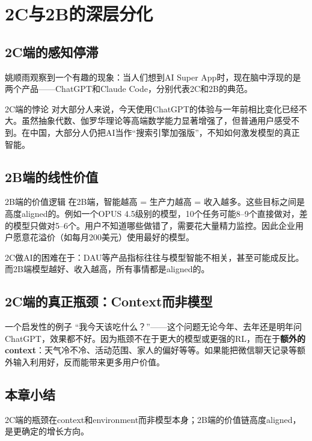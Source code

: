 \section{2C与2B的深层分化}

\subsection{2C端的感知停滞}

姚顺雨观察到一个有趣的现象：当人们想到AI Super App时，现在脑中浮现的是两个产品——ChatGPT和Claude Code，分别代表2C和2B的典范。

\begin{warningbox}{2C端的悖论}
对大部分人来说，今天使用ChatGPT的体验与一年前相比变化已经不大。虽然抽象代数、伽罗华理论等高端数学能力显著增强了，但普通用户感受不到。在中国，大部分人仍把AI当作``搜索引擎加强版''，不知如何激发模型的真正智能。
\end{warningbox}

\subsection{2B端的线性价值}

\begin{importantbox}{2B端的价值逻辑}
在2B端，智能越高 = 生产力越高 = 收入越多。这些目标之间是高度aligned的。例如一个OPUS 4.5级别的模型，10个任务可能8--9个直接做对，差的模型只做对5--6个。用户不知道哪些做错了，需要花大量精力监控。因此企业用户愿意花溢价（如每月200美元）使用最好的模型。
\end{importantbox}

2C做AI的困难在于：DAU等产品指标往往与模型智能不相关，甚至可能成反比。而2B端模型越好、收入越高，所有事情都是aligned的。

\subsection{2C端的真正瓶颈：Context而非模型}

\begin{knowledgebox}{一个启发性的例子}
``我今天该吃什么？''——这个问题无论今年、去年还是明年问ChatGPT，效果都不好。因为瓶颈不在于更大的模型或更强的RL，而在于\textbf{额外的context}：天气冷不冷、活动范围、家人的偏好等等。如果能把微信聊天记录等额外输入利用好，反而能带来更多用户价值。
\end{knowledgebox}

\subsection{本章小结}

2C端的瓶颈在context和environment而非模型本身；2B端的价值链高度aligned，是更确定的增长方向。



